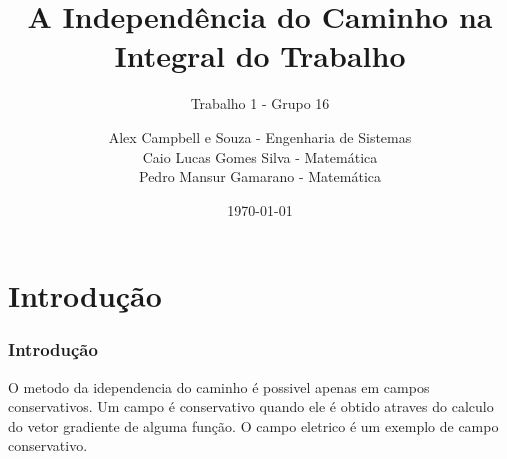 \documentclass{beamer}
\title{A Independência do Caminho na Integral do Trabalho}
\subtitle{Trabalho 1 - Grupo 16}
\author [Alex, Caio, Pedro]{
    \small Alex Campbell e Souza - Engenharia de Sistemas \\ 
    Caio Lucas Gomes Silva - Matemática \\ 
    Pedro Mansur Gamarano - Matemática
}
\institute[]{
    \large UFMG \\
    \footnotesize Universidade Federal de Minas Gerais \\
    \small Fundamentos de Eletromagnetismo
}
\date{\today}
\begin{document}
\frame{\titlepage}

\frame{\tableofcontents}

\section{Introdução}
\begin{frame}
    \frametitle{Introdução}
    O metodo da idependencia do caminho  é possivel apenas em  campos conservativos. Um campo é conservativo quando ele é obtido atraves do calculo do vetor gradiente de alguma função. 
    O campo eletrico é um exemplo de campo conservativo.




\end{frame}
\end{document}
